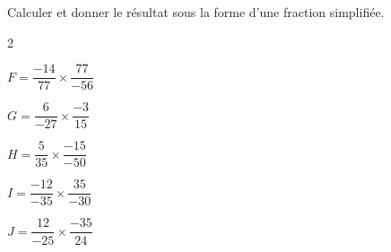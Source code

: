 \begin{exercice*}
    Calculer et donner le résultat sous la forme d'une fraction simplifiée.
    \begin{multicols}2
        \begin{list}{}{}
            \begin{spacing}{2}
                \item $F = \dfrac{-14}{77}\times\dfrac{77}{-56}$
                \item $G = \dfrac{6}{-27}\times\dfrac{-3}{15}$
                \item $H = \dfrac{5}{35}\times\dfrac{-15}{-50}$
                \item $I = \dfrac{-12}{-35}\times\dfrac{35}{-30}$
                \item $J = \dfrac{12}{-25}\times\dfrac{-35}{24}$
            \end{spacing}
        \end{list}
    \end{multicols}
\end{exercice*}
